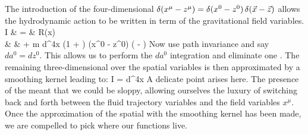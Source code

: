 \documentclass{article}
\begin{document}
The introduction of the four-dimensional \dfunc $\delta(x^{\mu} -
z^{\mu}) = \delta(x^0 - z^0) \, \delta(\vec {x} - \vec {z})$ allows the
hydrodynamic action to be written in term of the gravitational
field variables.
\beas
I & = &   R(x)  \\
  &   & + m  d^4x \push (1 + \erg)  \gd(x^0 - z^0) \gd( - )
\eeas
Now use path invariance and say $da^0 = dz^0$.  This allows us to
perform the $da^0$ integration and eliminate one \dfunc. The
remaining three-dimensional \dfunc over the spatial variables is
then approximated by a smoothing kernel leading to:
\bes
I =  \int d^4x \push {}
\ees
A delicate point arises here.  The presence of the \dfuncs meant
that we could be sloppy, allowing ourselves the luxury of
switching back and forth between the fluid trajectory variables
\ptraj{\gm} and the field variables $x^\mu$.  Once the
approximation of the spatial \dfuncs with the smoothing kernel has
been made, we are compelled to pick where our functions live.
\end{document}
